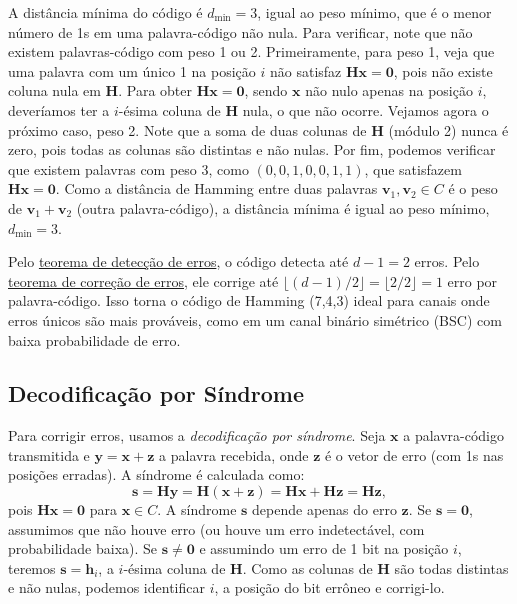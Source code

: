 A distância mínima do código é $d_{\text{min}} = 3$, igual ao peso mínimo, que é o menor
número de 1s em uma palavra-código não nula. Para verificar, note que não
existem palavras-código com peso 1 ou 2.
Primeiramente, para peso 1, veja que uma palavra com um único 1 na posição $i$ não
satisfaz $\mathbf{H} \mathbf{x} = \mathbf{0}$, pois não existe coluna nula em $\mathbf{H}$. 
Para obter $\mathbf{H} \mathbf{x} = \mathbf{0}$, sendo $\mathbf{x}$ não nulo apenas na posição $i$,
deveríamos ter a $i$-ésima coluna de $\mathbf{H}$ nula, o que não ocorre.
Vejamos agora o próximo caso, peso 2. Note que a soma de duas colunas de $\mathbf{H}$ (módulo 2) nunca é zero,
pois todas as colunas são distintas e não nulas.
Por fim, podemos verificar que existem palavras com peso 3, como $(0,0,1,0,0,1,1)$, que satisfazem $\mathbf{H} \mathbf{x} = \mathbf{0}$.
Como a distância de Hamming entre duas palavras $\mathbf{v}_1, \mathbf{v}_2 \in C$ 
é o peso de $\mathbf{v}_1 + \mathbf{v}_2$ (outra palavra-código), 
a distância mínima é igual ao peso mínimo, $d_{\text{min}} = 3$.

Pelo \hyperref[thm:deteccaoerros]{teorema de detecção de erros}, o código detecta até $d - 1 = 2$ erros. 
Pelo \hyperref[thm:correcaoerros]{teorema de correção de erros}, ele corrige até $\lfloor (d - 1)/2 \rfloor = \lfloor 2/2 \rfloor = 1$ erro por palavra-código. 
Isso torna o código de Hamming (7,4,3) ideal para canais onde erros únicos são mais prováveis, 
como em um canal binário simétrico (BSC) com baixa probabilidade de erro.



\subsection{Decodificação por Síndrome}
Para corrigir erros, usamos a \emph{decodificação por síndrome}. 
Seja $\mathbf{x}$ a palavra-código transmitida e $\mathbf{y} = \mathbf{x} + \mathbf{z}$ 
a palavra recebida, onde $\mathbf{z}$ é o vetor de erro (com 1s nas posições erradas). 
A síndrome é calculada como:
\begin{equation}
\mathbf{s} = \mathbf{H} \mathbf{y} = \mathbf{H} (\mathbf{x} + \mathbf{z}) = \mathbf{H} \mathbf{x} + \mathbf{H} \mathbf{z} = \mathbf{H} \mathbf{z},
\end{equation}
pois $\mathbf{H} \mathbf{x} = \mathbf{0}$ para $\mathbf{x} \in C$. 
A síndrome $\mathbf{s}$ depende apenas do erro $\mathbf{z}$. 
Se $\mathbf{s} = \mathbf{0}$, assumimos que não houve erro (ou houve um erro indetectável, com probabilidade baixa).
Se $\mathbf{s} \neq \mathbf{0}$ e assumindo um erro de 1 bit na posição $i$, 
teremos $\mathbf{s} = \mathbf{h}_i$, a $i$-ésima coluna de $\mathbf{H}$.
Como as colunas de $\mathbf{H}$ são todas distintas e não nulas, podemos identificar $i$,
a posição do bit errôneo e corrigi-lo.

